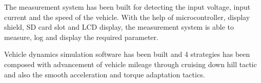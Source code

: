 The measurement system has been built for detecting the input voltage, input current and the speed of the vehicle. With the help of microcontroller, display shield, SD card slot and LCD display, the measurement system is able to measure, log and display the required parameter.

Vehicle dynamics simulation software has been built and 4 strategies has been composed with advancement of vehicle mileage through cruising down hill tactic and also the smooth acceleration and torque adaptation tactics.
